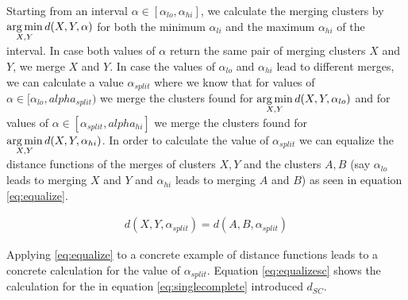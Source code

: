 Starting from an interval $\alpha \in [\alpha_{lo}, \alpha_{hi}]$, we calculate the merging clusters by $\operatorname*{arg\,min}\limits_{X, Y} d(X,Y,\alpha)$ for both the minimum $\alpha_{li}$ and the maximum $\alpha_{hi}$ of the interval. In case both values of $\alpha$ return the same pair of merging clusters $X$ and $Y$, we merge $X$ and $Y$. In case the values of $\alpha_{lo}$ and $\alpha_{hi}$ lead to different merges, we can calculate a value $\alpha_{split}$ where we know that for values of $\alpha \in [\alpha_{lo}, alpha_{split})$ we merge the clusters found for $\operatorname*{arg\,min}\limits_{X, Y} d(X,Y,\alpha_{lo})$ and for values of $\alpha \in [\alpha_{split}, alpha_{hi}]$ we merge the clusters found for $\operatorname*{arg\,min}\limits_{X, Y} d(X,Y,\alpha_{hi})$. In order to calculate the value of $\alpha_{split}$ we can equalize the distance functions of the merges of clusters $X, Y$ and the clusters $A, B$ (say $\alpha_{lo}$ leads to merging $X$ and $Y$ and $\alpha_{hi}$ leads to merging $A$ and $B$) as seen in equation \ref{eq:equalize}. 

\begin{equation}
    \begin{aligned}
        d(X,Y,\alpha_{split}) = d(A,B,\alpha_{split})
    \end{aligned}
    \label{eq:equalize}
\end{equation}

Applying \ref{eq:equalize} to a concrete example of distance functions leads to a concrete calculation for the value of $\alpha_{split}$. Equation \ref{eq:equalizesc} shows the calculation for the in equation \ref{eq:singlecomplete} introduced $d_{SC}$.

